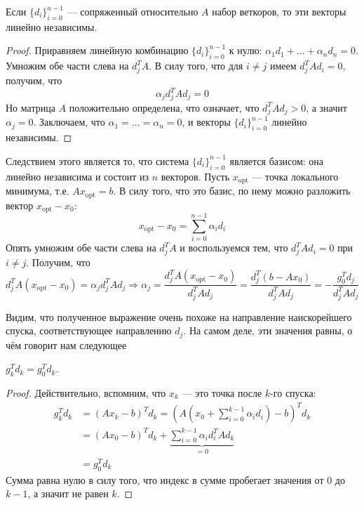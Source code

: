 \documentclass[a4paper, 12pt]{article}
\begin{document}
\begin{Statement}
Если $\{d_i\}_{i=0}^{n-1}$ --- сопряженный относительно $A$ набор веткоров, то эти векторы линейно независимы.
\end{Statement}
\begin{proof}
Приравняем линейную комбинацию $\{d_i\}_{i=0}^{n-1}$ к нулю: $\alpha_1 d_1 + \dots + \alpha_n d_n = 0$. Умножим обе части слева на $d_j^T A$. В силу того, что для $i \neq j$ имеем $d_j^T A d_i = 0$, получим, что
$$\alpha_j d_j^T A d_j = 0$$
Но матрица $A$ положительно определена, что означает, что $d_j^T A d_j > 0$, а значит $\alpha_j = 0$. Заключаем, что $\alpha_1 = \dots = \alpha_n = 0$, и векторы $\{d_i\}_{i=0}^{n-1}$ линейно независимы.
\end{proof}

Следствием этого является то, что система $\{d_i\}_{i=0}^{n-1}$ является базисом: она линейно независима и состоит из $n$ векторов. Пусть $x_{\mathrm{opt}}$ --- точка локального минимума, т.е. $Ax_{\mathrm{opt}} = b$. В силу того, что это базис, по нему можно разложить вектор $x_{\mathrm{opt}} - x_0$:
$$x_{\mathrm{opt}} - x_0 = \sum_{i=0}^{n-1} \alpha_i d_i$$
Опять умножим обе части слева на $d_j^TA$ и воспользуемся тем, что $d_j^TAd_i = 0$ при $i \neq j$. Получим, что 
$$d_j^T A(x_{\mathrm{opt}} - x_0) = \alpha_jd_j^TAd_j \Rightarrow \alpha_j = \frac{d_j^T A(x_{\mathrm{opt}} - x_0)}{d_j^TAd_j} = \frac{d_j^T (b - Ax_0)}{d_j^TAd_j} = -\frac{g_0^T d_j}{d_j^TAd_j}$$

Видим, что полученное выражение очень похоже на направление наискорейшего спуска, соответствующее направлению $d_j$. На самом деле, эти значения равны, о чём говорит нам следующее

\begin{Statement}
$g_k^Td_k = g_0^Td_k$.
\end{Statement}
\begin{proof} Действительно, вспомним, что $x_k$ --- это точка после $k$-го спуска:
\begin{align}
    g_k^T d_k &= (Ax_k - b)^T d_k = \left(A \left(x_0 + \sum_{i=0}^{k - 1} \alpha_i d_i \right) - b \right)^T d_k \\ &= (Ax_0 - b)^T d_k + \underbrace{\sum_{i=0}^{k-1}\alpha_i d_i^T A d_k}_{=0} \\ &= g_0^T d_k
\end{align} Сумма равна нулю в силу того, что индекс в сумме пробегает значения от 0 до $k-1$, а значит не равен $k$.
\end{proof}
\end{document}

